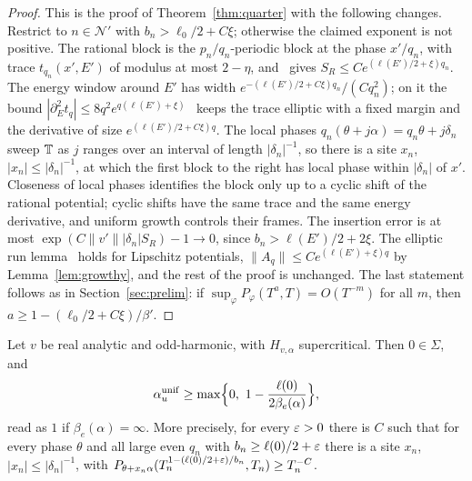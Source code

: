 \begin{proof}
This is the proof of Theorem~\ref{thm:quarter} with the following changes. Restrict to $n\in\mathcal N'$ with $b_n>\ell_0/2+C\xi$; otherwise the claimed exponent is not positive. The rational block is the $p_n/q_n$-periodic block at the phase $x'/q_n$, with trace $t_{q_n}(x',E')$ of modulus at most $2-\eta$, and~\cite[Lemma~8.2(1)]{DMamo} gives $S_R\le Ce^{(\ell(E')/2+\xi)q_n}$. The energy window around $E'$ has width $e^{-(\ell(E')/2+C\xi)q_n}/(Cq_n^2)$; on it the bound $|\partial_E^2t_q|\le8q^2e^{q(\ell(E')+\xi)}$~\cite[Corollary~5.6]{DMuniv} keeps the trace elliptic with a fixed margin and the derivative of size $e^{(\ell(E')/2+C\xi)q}$. The local phases $q_n(\theta+j\alpha)=q_n\theta+j\delta_n$ sweep $\mathbb T$ as $j$ ranges over an interval of length $|\delta_n|^{-1}$, so there is a site $x_n$, $|x_n|\le|\delta_n|^{-1}$, at which the first block to the right has local phase within $|\delta_n|$ of $x'$. Closeness of local phases identifies the block only up to a cyclic shift of the rational potential; cyclic shifts have the same trace and the same energy derivative, and uniform growth controls their frames. The insertion error is at most $\exp(C\|v'\||\delta_n|S_R)-1\to0$, since $b_n>\ell(E')/2+2\xi$. The elliptic run lemma~\cite[Lemma~9.6]{DMamo} holds for Lipschitz potentials, $\|A_{q}\|\le Ce^{(\ell(E')+\xi)q}$ by Lemma~\ref{lem:growthy}, and the rest of the proof is unchanged. The last statement follows as in Section~\ref{sec:prelim}: if $\sup_\varphi P_\varphi(T^a,T)=O(T^{-m})$ for all $m$, then $a\ge1-(\ell_0/2+C\xi)/\beta'$.
\end{proof}

\begin{theorem}\label{thm:oddharm}
Let $v$ be real analytic and odd-harmonic, with $H_{v,\alpha}$ supercritical. Then $0\in\Sigma$, and
\[
\aunif\ge\max\Bigl\{0,\ 1-\frac{\ell(0)}{2\beta_e(\alpha)}\Bigr\},
\]
read as $1$ if $\beta_e(\alpha)=\infty$. More precisely, for every $\varepsilon>0$ there is $C$ such that for every phase $\theta$ and all large even $q_n$ with $b_n\ge\ell(0)/2+\varepsilon$ there is a site $x_n$, $|x_n|\le|\delta_n|^{-1}$, with $P_{\theta+x_n\alpha}(T_n^{1-(\ell(0)/2+\varepsilon)/b_n},T_n)\ge T_n^{-C}$.
\end{theorem}

